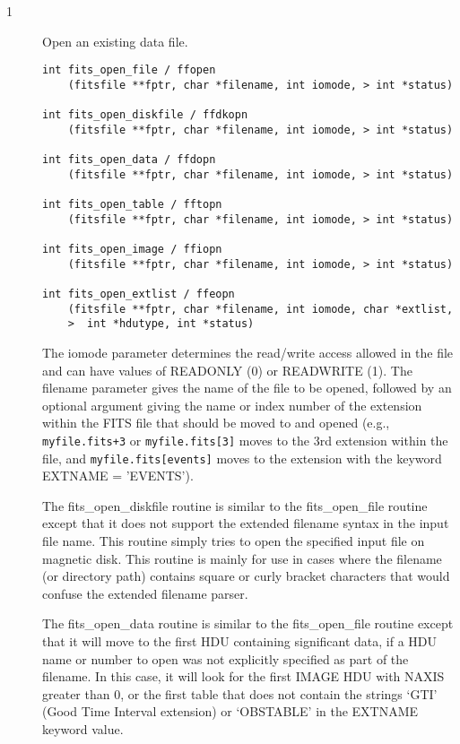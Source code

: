 \documentclass[11pt]{book}
\begin{document}
\begin{description}
\item[1 ] Open an existing data file. \label{ffopen}


\begin{verbatim}
int fits_open_file / ffopen
    (fitsfile **fptr, char *filename, int iomode, > int *status)

int fits_open_diskfile / ffdkopn
    (fitsfile **fptr, char *filename, int iomode, > int *status)

int fits_open_data / ffdopn
    (fitsfile **fptr, char *filename, int iomode, > int *status)

int fits_open_table / fftopn
    (fitsfile **fptr, char *filename, int iomode, > int *status)

int fits_open_image / ffiopn
    (fitsfile **fptr, char *filename, int iomode, > int *status)

int fits_open_extlist / ffeopn
    (fitsfile **fptr, char *filename, int iomode, char *extlist,
    >  int *hdutype, int *status)
\end{verbatim}

The iomode parameter determines the read/write access allowed in the
file and can have values of READONLY (0) or READWRITE (1). The filename
parameter gives the name of the file to be opened, followed by an
optional argument giving the name or index number of the extension
within the FITS file that should be moved to and opened (e.g.,
\verb-myfile.fits+3- or \verb-myfile.fits[3]- moves to the 3rd extension within
the file, and \verb-myfile.fits[events]- moves to the extension with the
keyword EXTNAME = 'EVENTS').

The fits\_open\_diskfile routine is similar to the fits\_open\_file routine
except that it does not support the extended filename syntax in the input
file name.  This routine simply tries to open the specified input file
on magnetic disk.  This routine is mainly for use in cases where the
filename (or directory path) contains square or curly bracket characters
that would confuse the extended filename parser.

The fits\_open\_data routine is similar to the fits\_open\_file routine
except that it will move to the first HDU containing significant data,
if a HDU name or number to open was not explicitly specified as
part of the filename.  In this case, it will look for the first
IMAGE HDU with NAXIS greater than 0, or the first table that does not contain the
strings `GTI' (Good Time Interval extension) or `OBSTABLE' in the
EXTNAME keyword value.


\end{description}
\end{document}
